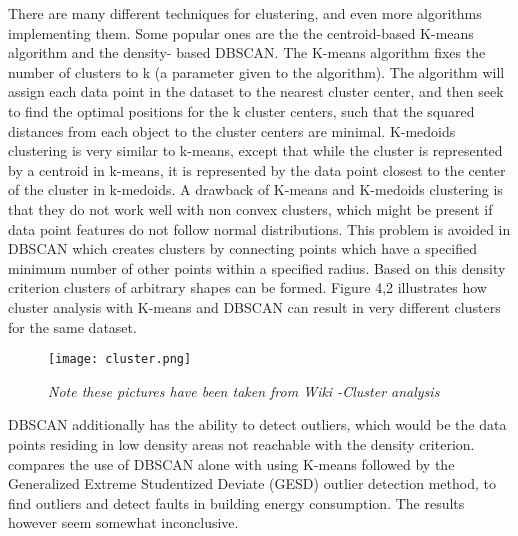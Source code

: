 There are many different techniques for clustering, and even more algorithms implementing them. Some popular ones are the the centroid-based K-means algorithm and the density- based DBSCAN. The K-means algorithm fixes the number of clusters to k (a parameter given to the algorithm). The algorithm will assign each data point in the dataset to the nearest cluster center, and then seek to find the optimal positions for the k cluster centers, such that the squared distances from each object to the cluster centers are minimal. K-medoids clustering is very similar to k-means, except that while the cluster is represented by a centroid in k-means, it is represented by the data point closest to the center of the cluster in k-medoids. A drawback of K-means and K-medoids clustering is that they do not work well with non convex clusters, which might be present if data point features do not follow normal distributions. This problem is avoided in DBSCAN which creates clusters by connecting points which have a specified minimum number of other points within a specified radius. Based on this density criterion clusters of arbitrary shapes can be formed. Figure 4,2 illustrates how cluster analysis with K-means and DBSCAN can result in very different clusters for the same dataset.
\begin{figure}
\begin{center}
\texttt{[image: cluster.png]}
\end{center}
\caption{\emph{Note these pictures have been taken from Wiki -Cluster analysis}}
\end{figure}
DBSCAN additionally has the ability to detect outliers, which would be the data points residing in low density areas not reachable with the density criterion. \cite{faultdetec3} compares the use of DBSCAN alone with using K-means followed by the Generalized Extreme Studentized Deviate (GESD) outlier detection method, to find  outliers and detect faults in building energy consumption. The results however seem somewhat inconclusive. 
\newline

